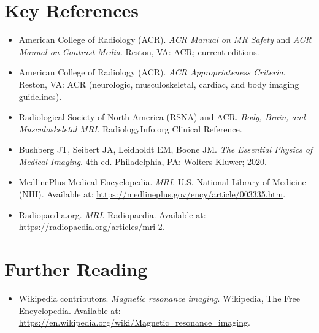 \section{Key References}
\begin{itemize}
\item American College of Radiology (ACR). \textit{ACR Manual on MR Safety} and \textit{ACR Manual on Contrast Media}. Reston, VA: ACR; current editions.
\item American College of Radiology (ACR). \textit{ACR Appropriateness Criteria}. Reston, VA: ACR (neurologic, musculoskeletal, cardiac, and body imaging guidelines).
\item Radiological Society of North America (RSNA) and ACR. \textit{Body, Brain, and Musculoskeletal MRI}. RadiologyInfo.org Clinical Reference.
\item Bushberg JT, Seibert JA, Leidholdt EM, Boone JM. \textit{The Essential Physics of Medical Imaging}. 4th ed. Philadelphia, PA: Wolters Kluwer; 2020.
\item MedlinePlus Medical Encyclopedia. \textit{MRI}. U.S. National Library of Medicine (NIH). Available at: \url{https://medlineplus.gov/ency/article/003335.htm}.
\item Radiopaedia.org. \textit{MRI}. Radiopaedia. Available at: \url{https://radiopaedia.org/articles/mri-2}.
\end{itemize}

\section{Further Reading}
\begin{itemize}
  \item Wikipedia contributors. \textit{Magnetic resonance imaging}. Wikipedia, The Free Encyclopedia. Available at: \url{https://en.wikipedia.org/wiki/Magnetic_resonance_imaging}.
\end{itemize}
